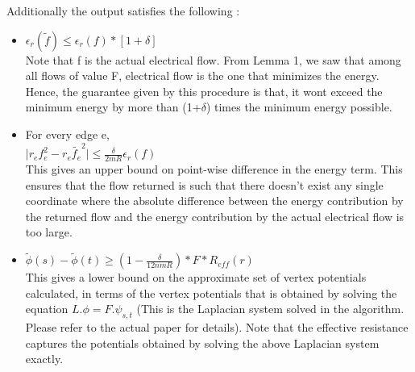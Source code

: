 \documentclass[BTech]{iitmdiss}
\begin{document}
	     Additionally the output satisfies the following : 
	  \begin{itemize}
	  \item 
	    $\epsilon_r(\widetilde{f}) \leq \epsilon_r(f)\ast [1+\delta]$ \\
	    
	    Note that f is the actual electrical flow. From Lemma 1, we saw that among all flows of value F, electrical flow is the one that 
	    minimizes the energy. Hence, the guarantee given by this procedure is that, it wont exceed the minimum energy by more than (1+$\delta$)
	    times the minimum energy possible. 
	  \item
	    For every edge e, \\
	    
	    $\mid r_e f_e^2 - r_e \widetilde{f_e}^2 \mid \leq \frac{\delta}{2mR}\epsilon_r(f)$ \\
	    
	    This gives an upper bound on point-wise difference in the energy term. This ensures that the flow returned is such that there doesn't exist
	    any single coordinate where the absolute difference between the energy contribution by the returned flow and the energy contribution by the 
	    actual electrical flow is too large.
	  \item
	    $\widetilde{\phi}(s)-\widetilde{\phi}(t) \geq (1-\frac{\delta}{12nmR})\ast F \ast R_{eff}(r)$ \\
	    
	    This gives a lower bound on the approximate set of vertex potentials calculated, in terms of the vertex potentials that is obtained 
	    by solving the equation $L.\phi = F.\psi_{s,t}$ (This is the Laplacian system solved in the algorithm. Please refer to the actual paper 
	    for details). Note that the effective resistance captures the potentials obtained by solving the above Laplacian system exactly.
	  \end{itemize}
	  
\end{document}
